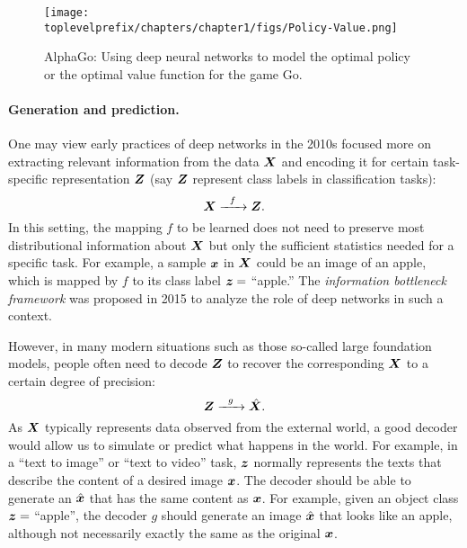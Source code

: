 \documentclass[../../book-main.tex]{subfiles}
\begin{document}
\begin{figure}
    \centering
    \texttt{[image: \\toplevelprefix/chapters/chapter1/figs/Policy-Value.png]}
    \caption{AlphaGo: Using deep neural networks to model the optimal policy or the optimal value function for the game Go. }
    \label{fig:Alpha-Go}
\end{figure}

\paragraph{Generation and prediction.}
One may view early practices of deep networks in the 2010s focused more on extracting relevant information from the data $\bm{X}$ and encoding it for certain task-specific representation $\bm{Z}$ (say $\bm{Z}$ represent class labels in classification tasks):
\begin{equation}
    \bm{X}   \xrightarrow{\hspace{2mm} f \hspace{2mm}} \bm{Z}.
       \label{eqn:encoding-deep-networks}
\end{equation}
In this setting, the mapping $f$ to be learned does not need to preserve most  distributional information about $\bm{X}$ but only the sufficient statistics needed for a specific task. For example, a sample $\bm{x}$ in $\bm{X}$ could be an image of an apple, which is mapped by $f$ to its class label $\bm{z} =$ ``apple.'' The {\em information bottleneck framework} \cite{Tishby-ITW2015} was proposed in 2015 to analyze the role of deep networks in such a context.
 
However, in many modern situations such as those so-called large foundation models,  people often need to decode $\bm{Z}$ to recover the corresponding $\bm{X}$ to a certain degree of precision:
\begin{equation}
    \bm{Z}   \xrightarrow{\hspace{2mm} g  \hspace{2mm}} \hat {\bm{X}}.
       \label{eqn:decoding-deep-networks}
\end{equation}
As $\bm{X}$ typically represents data observed from the external world, a good decoder would allow us to simulate or predict what happens in the world. For example, in a ``text to image'' or ``text to video'' task, $\bm{z}$ normally represents the texts that describe the content of a desired image $\bm{x}$. The decoder should be able to generate an $\hat {\bm{x}}$ that has the same content as $\bm{x}$. For example, given an object class $\bm{z} = $ ``apple'', the decoder $g$ should generate an image $\hat {\bm{x}}$ that looks like an apple, although not necessarily exactly the same as the original $\bm{x}$. 
\end{document}
